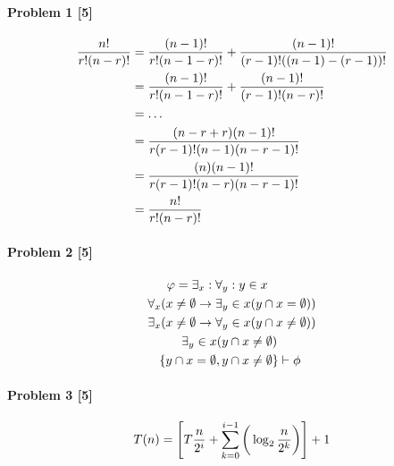\documentclass[12pt]{article}
\begin{document}
\maketitle

\paragraph{Problem 1 [5]}
\begin{align}
	\frac{n!}{r!(n - r)!} &=
	\frac{(n -1)!}{r!(n - 1 - r)!} + \frac{(n - 1)!}{(r - 1)!((n - 1) - (r - 1))!}\notag\\
	&= \frac{(n-1)!}{r!(n - 1 - r)!} + \frac{(n - 1)!}{(r - 1)!(n - r)!}\notag\\
	&= \ldots\notag\\
	&= \frac{(n - r + r)(n - 1)!}{r(r - 1)!(n - 1)(n - r - 1)!}\notag\\
	&= \frac{(n)(n - 1)!}{r(r - 1)!(n - r)(n - r - 1)!}\notag\\
	&= \frac{n!}{r!(n - r)!}\notag\\
\end{align}

\paragraph{Problem 2 [5]}
\begin{align}
	\varphi = \exists_{x} :\forall_{y} &: y \in x\notag\\
	\forall_{x}(x \neq \emptyset \rightarrow \exists_{y} &\in x(y \cap x = \emptyset))\notag\\
	\exists_{x}(x \neq \emptyset \rightarrow \forall_{y} &\in x(y \cap x \neq \emptyset))\notag\\
	\exists_{y} \in x(y &\cap x \neq \emptyset)\notag\\
	\{y \cap x = \emptyset, y &\cap x \neq \emptyset\} \vdash \phi\notag\\
\end{align}

\paragraph{Problem 3 [5]}
\begin{align}
	T(n) = \Bigg[ T\frac{n}{2^i} + \sum_{k=0}^{i-1} \bigg( \log_{2}\frac{n}{2^k}\bigg)\Bigg] + 1\notag\\
\end{align}
\end{document}
